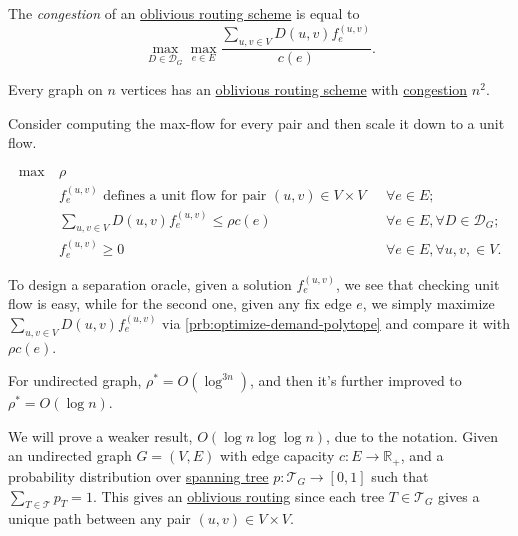 \begin{definition}[Congestion]\label{def:congestion}
	The \emph{congestion} of an \hyperref[def:oblivious-routing-scheme]{oblivious routing scheme} is equal to
	\[
		\max _{D \in \mathcal{D} _G} \max _{e \in E} \frac{\sum_{u, v \in V} D(u, v) f_e^{(u, v)}}{c(e)}.
	\]
\end{definition}

\begin{claim}
	Every graph on \(n\) vertices has an \hyperref[def:oblivious-routing]{oblivious routing scheme} with \hyperref[def:congestion]{congestion} \(n^2\).
\end{claim}
\begin{explanation}
	Consider computing the max-flow for every pair and then scale it down to a unit flow.
\end{explanation}

\[
	\begin{aligned}
		\max ~ & \rho                                                                                                                          \\
		       & f_e^{(u, v)} \text{ defines a unit flow for pair \((u, v) \in V \times V\) } & \forall e \in E;                               \\
		       & \sum_{u, v \in V} D(u, v) f_e^{(u, v)}  \leq \rho c(e)                       & \forall e \in E, \forall D \in \mathcal{D} _G; \\
		       & f_e^{(u, v)} \geq 0                                                          & \forall e \in E, \forall u, v, \in V.
	\end{aligned}
\]

To design a separation oracle, given a solution \(f_e^{(u, v)}\), we see that checking unit flow is easy, while for the second one, given any fix edge \(e\), we simply maximize \(\sum_{u, v \in V} D(u, v) f_e^{(u, v)}\) via \autoref{prb:optimize-demand-polytope} and compare it with \(\rho c(e)\).

\begin{theorem}
	For undirected graph, \(\rho ^{\ast} = O(\log^{3 n} )\), and then it's further improved to \(\rho ^{\ast} = O(\log n)\).
\end{theorem}

We will prove a weaker result, \(O(\log n \log \log n)\), due to the notation. Given an undirected graph \(G = (V, E)\) with edge capacity \(c \colon E \to \mathbb{R} _+\), and a probability distribution over \hyperref[def:spanning-tree]{spanning tree} \(p\colon \mathcal{T} _G \to [0, 1]\) such that \(\sum_{T \in \mathcal{T} } p_T = 1\). This gives an \hyperref[def:oblivious-routing]{oblivious routing} since each tree \(T \in \mathcal{T} _G\) gives a unique path between any pair \((u, v) \in V \times V\).

